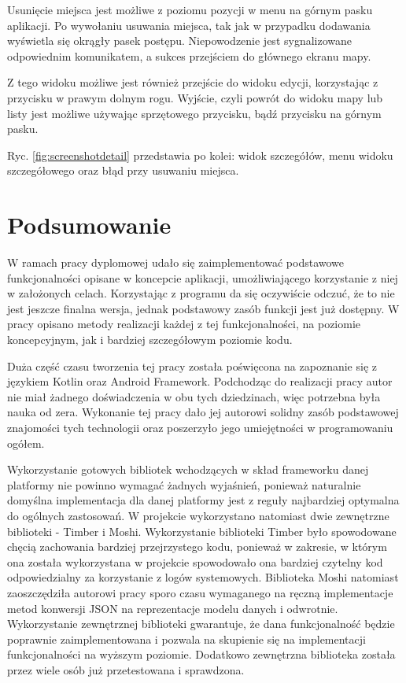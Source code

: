 \documentclass[polish,polish,a4paper,12pt]{article}
\let\sectioncmd\section
\renewcommand{\section}{\clearpage\sectioncmd}
\begin{document}
	Usunięcie miejsca jest możliwe z poziomu pozycji w menu na górnym pasku aplikacji. Po wywołaniu usuwania miejsca, tak jak w przypadku dodawania wyświetla się okrągły pasek postępu. Niepowodzenie jest sygnalizowane odpowiednim komunikatem, a sukces przejściem do głównego ekranu mapy.

	Z tego widoku możliwe jest również przejście do widoku edycji, korzystając z przycisku w prawym dolnym rogu. Wyjście, czyli powrót do widoku mapy lub listy jest możliwe używając sprzętowego przycisku, bądź przycisku na górnym pasku.

	Ryc. \ref{fig:screenshotdetail} przedstawia po kolei: widok szczegółów, menu widoku szczegółowego oraz błąd przy usuwaniu miejsca.

\section{Podsumowanie}\label{summary}

W ramach pracy dyplomowej udało się zaimplementować podstawowe funkcjonalności opisane w koncepcie aplikacji, umożliwiającego korzystanie z niej w założonych celach. Korzystając z programu da się oczywiście odczuć, że to nie jest jeszcze finalna wersja, jednak podstawowy zasób funkcji jest już dostępny. W pracy opisano metody realizacji każdej z tej funkcjonalności, na poziomie koncepcyjnym, jak i bardziej szczegółowym poziomie kodu.

Duża część czasu tworzenia tej pracy została poświęcona na zapoznanie się z językiem Kotlin oraz Android Framework. Podchodząc do realizacji pracy autor nie miał żadnego doświadczenia w obu tych dziedzinach, więc potrzebna była nauka od zera. Wykonanie tej pracy dało jej autorowi solidny zasób podstawowej znajomości tych technologii oraz poszerzyło jego umiejętności w programowaniu ogółem.

Wykorzystanie gotowych bibliotek wchodzących w skład frameworku danej platformy nie powinno wymagać żadnych wyjaśnień, ponieważ naturalnie domyślna implementacja dla danej platformy jest z reguły najbardziej optymalna do ogólnych zastosowań. W projekcie wykorzystano natomiast dwie zewnętrzne biblioteki - Timber i Moshi. Wykorzystanie biblioteki Timber było spowodowane chęcią zachowania bardziej przejrzystego kodu, ponieważ w zakresie, w którym ona została wykorzystana w projekcie spowodowało ona bardziej czytelny kod odpowiedzialny za korzystanie z logów systemowych. Biblioteka Moshi natomiast zaoszczędziła autorowi pracy sporo czasu wymaganego na ręczną implementacje metod konwersji JSON na reprezentacje modelu danych i odwrotnie. Wykorzystanie zewnętrznej biblioteki gwarantuje, że dana funkcjonalność będzie poprawnie zaimplementowana i pozwala na skupienie się na implementacji funkcjonalności na wyższym poziomie. Dodatkowo zewnętrzna biblioteka została przez wiele osób już przetestowana i sprawdzona.
\end{document}
